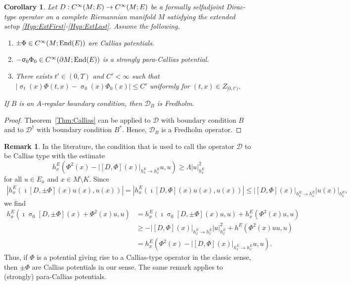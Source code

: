 \documentclass[a4paper,10pt,reqno]{amsart}
\newcommand{\sym}{\upsigma}
\newcommand{\modulus}[1]{|#1|}
\newcommand{\Ck}[2][{}]{{\rm C}^{#2}_{\rm #1}}%
\DeclareMathOperator{\End}{End} %
\newcommand{\DDD}{\mathscr{D}}%
\newcommand{\dM}{\partial M}
\newtheorem{corollary}[theorem]{Corollary}
\theoremstyle{definition}
\newtheorem{remark}[theorem]{Remark}
\begin{document}
\begin{corollary}
\label{Cor:Callias}
Let $D: \Ck{\infty}(M;E) \to \Ck{\infty}(M;E)$ be a formally selfadjoint Dirac-type operator on a complete Riemannian manifold $M$ satisfying the  extended setup \ref{Hyp:ExtFirst}-\ref{Hyp:ExtLast}.
Assume the following. 
\begin{enumerate}[label=(\roman*), labelwidth=0pt, labelindent=2pt, leftmargin=21pt]
\item $\pm\Phi \in \Ck{\infty}(M;\End(E))$ are Callias potentials.
\item $-\sym_0 \Phi_0 \in \Ck{\infty}(\dM;\End(E))$ is a strongly para-Callias potential.
\item There exists $t' \in (0,T)$ and $C' < \infty $  such that $\modulus{\sym_t(x) \Phi(t,x) - \sym_0(x)\Phi_0(x)} \leq C'$ uniformly for $(t,x) \in Z_{[0,t')}$.
\end{enumerate} 
If $B$ is an $A$-regular boundary condition, then $\DDD_B$ is Fredholm.
\end{corollary}

\begin{proof}
Theorem~\ref{Thm:Callias} can be applied to $\DDD$ with boundary condition $B$ and to $\DDD^\dagger$ with boundary condition $B^*$.
Hence, $\DDD_B$ is a Fredholm operator.
\end{proof}



\begin{remark}
\label{Rem:Callias} 
In the literature, the condition that is used to call the operator $\DDD$ to be Callias type with the estimate  
\[
h^E_x( \Phi^2(x) - \modulus{[D,\Phi](x)}_{h^E_x \to h^E_x} u, u)
\geq \Lambda \modulus{u}_{h^E_x}^2
\]
for all $u \in E_x$ and $x \in M \setminus K$.
Since 
\begin{align*} 
\modulus{ h^{E}_x (\imath [D,\pm \Phi](x) u(x) , u(x))} 
=
\modulus{ h^{E}_x (\imath [D,\Phi](x) u(x) , u(x))} 
\leq 
\modulus{[D,\Phi](x)}_{h^E_x \to h^E_x}  \modulus{u(x)}_{h^E_x},
\end{align*} 
we find 
\begin{align*} 
h^E_x(\imath \sym_0 [D,\pm\Phi](x) + \Phi^2(x) u, u) 
&= 
h^E_x(\imath \sym_0 [D,\pm\Phi](x) u, u) + h^E_x(\Phi^2(x) u, u)   \\ 
&\geq 
-\modulus{[D,\Phi](x)}_{h^E_x \to h^E_x} \modulus{u}_{h^E_x}^2 + h^E(\Phi^2(x) u u, u) \\ 
&= 
 h^E_x(  \Phi^2(x) - \modulus{[D,\Phi](x)}_{h^E_x \to h^E_x} u, u).
\end{align*}
Thus, if $\Phi$ is a potential giving rise to a Callias-type operator in the classic sense, then $\pm\Phi$ are Callias potentials in our sense. 
The same remark applies to (strongly) para-Callias potentials.
\end{remark}
\end{document}
